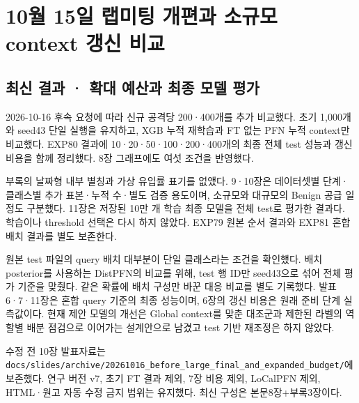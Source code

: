 \section{10월 15일 랩미팅 개편과 소규모 context 갱신 비교}
\subsection{최신 결과 · 확대 예산과 최종 모델 평가}
2026-10-16 후속 요청에 따라 신규 공격당 200·400개를 추가 비교했다. 초기 1,000개와 seed43 단일 실행을 유지하고, XGB 누적 재학습과 FT 없는 PFN 누적 context만 비교했다. EXP80 결과에 10·20·50·100·200·400개의 최종 전체 test 성능과 갱신 비용을 함께 정리했다. 8장 그래프에도 여섯 조건을 반영했다.

부록의 날짜형 내부 별칭과 가상 유입률 표기를 없앴다. 9·10장은 데이터셋별 단계·클래스별 추가 표본·누적 수·별도 검증 용도이며, 소규모와 대규모의 Benign 공급 일정도 구분했다. 11장은 저장된 10만 개 학습 최종 모델을 전체 test로 평가한 결과다. 학습이나 threshold 선택은 다시 하지 않았다. EXP79 원본 순서 결과와 EXP81 혼합 배치 결과를 별도 보존한다.

원본 test 파일의 query 배치 대부분이 단일 클래스라는 조건을 확인했다. 배치 posterior를 사용하는 DistPFN의 비교를 위해, test 행 ID만 seed43으로 섞어 전체 평가 기준을 맞췄다. 같은 확률에 배치 구성만 바꾼 대응 비교를 별도 기록했다. 발표 6·7·11장은 혼합 query 기준의 최종 성능이며, 6장의 갱신 비용은 원래 준비 단계 실측값이다. 현재 제안 모델의 개선은 Global context를 맞춘 대조군과 제한된 라벨의 역할별 배분 점검으로 이어가는 설계안으로 남겼고 test 기반 재조정은 하지 않았다.

수정 전 10장 발표자료는 \texttt{docs/\allowbreak{}\allowbreak{}sli\allowbreak{}des/\allowbreak{}\allowbreak{}arch\allowbreak{}ive/\allowbreak{}\allowbreak{}2026\allowbreak{}1016\_\allowbreak{}\allowbreak{}bef\allowbreak{}ore\_\allowbreak{}\allowbreak{}larg\allowbreak{}e\_\allowbreak{}\allowbreak{}final\_\allowbreak{}\allowbreak{}and\_\allowbreak{}\allowbreak{}expa\allowbreak{}nded\_\allowbreak{}\allowbreak{}bud\allowbreak{}get/\allowbreak{}\allowbreak{}}에 보존했다. 연구 버전 v7, 초기 FT 결과 제외, 7장 비용 제외, LoCalPFN 제외, HTML·원고 자동 수정 금지 범위는 유지했다. 최신 구성은 본문8장+\allowbreak{}부록3장이다.


